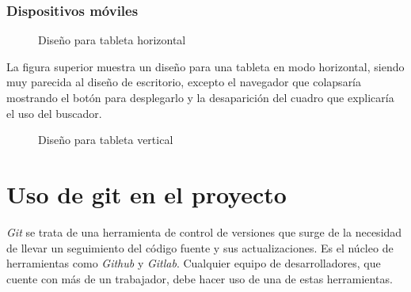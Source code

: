 \begin{enumerate}
\subsubsection{Dispositivos móviles}
\begin{figure}[h!]
\centering
{}
\caption{Diseño para tableta horizontal}
\label{fig:surface}
\end{figure}
La figura superior muestra un diseño para una tableta en modo horizontal, siendo muy parecida al diseño de escritorio, excepto el navegador que colapsaría mostrando el botón para desplegarlo y la desaparición del cuadro que explicaría el uso del buscador.

\begin{figure}[h!]
\centering
{}
\caption{Diseño para tableta vertical}
\label{fig:ipad}
\end{figure}

\newpage
\section{Uso de git en el proyecto}
\emph{Git} se trata de una herramienta de control de versiones que surge de la necesidad de llevar un seguimiento del código fuente y sus actualizaciones. Es el núcleo de herramientas como \emph{Github} y \emph{Gitlab}. Cualquier equipo de desarrolladores, que cuente con más de un trabajador, debe hacer uso de una de estas herramientas.


\end{enumerate}
